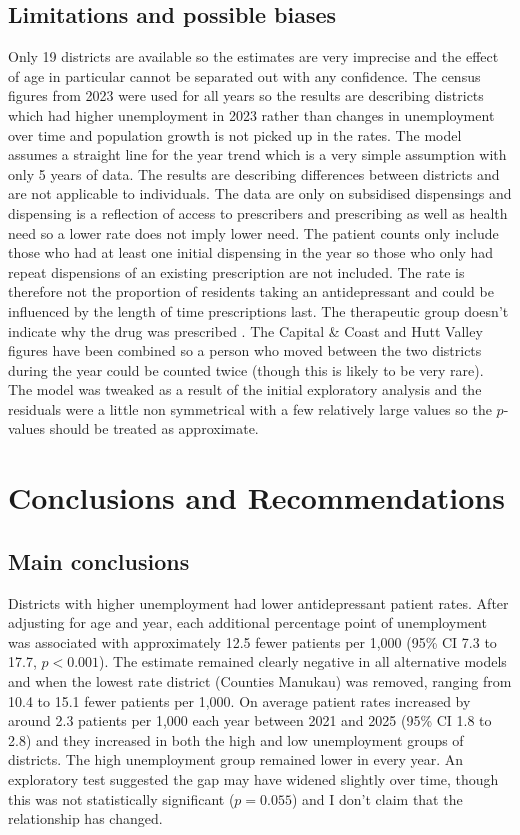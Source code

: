\documentclass[11pt,a4paper]{article}
\begin{document}
\subsection{Limitations and possible biases}
Only 19 districts are available so the estimates are very imprecise and the effect of age in particular cannot be separated out with any confidence. The census figures from 2023 were used for all years so the results are describing districts which had higher unemployment in 2023 rather than changes in unemployment over time and population growth is not picked up in the rates. The model assumes a straight line for the year trend which is a very simple assumption with only 5 years of data. The results are describing differences between districts and are not applicable to individuals. The data are only on subsidised dispensings and dispensing is a reflection of access to prescribers and prescribing as well as health need so a lower rate does not imply lower need. The patient counts only include those who had at least one initial dispensing in the year so those who only had repeat dispensions of an existing prescription are not included. The rate is therefore not the proportion of residents taking an antidepressant and could be influenced by the length of time prescriptions last. The therapeutic group doesn't indicate why the drug was prescribed \cite{hnz}. The Capital \& Coast and Hutt Valley figures have been combined so a person who moved between the two districts during the year could be counted twice (though this is likely to be very rare). The model was tweaked as a result of the initial exploratory analysis and the residuals were a little non symmetrical with a few relatively large values so the $p$-values should be treated as approximate.

\section{Conclusions and Recommendations}

\subsection{Main conclusions}
Districts with higher unemployment had lower antidepressant patient rates. After adjusting for age  and year, each additional percentage point of unemployment was associated with approximately 12.5 fewer patients per 1,000 (95\% CI 7.3 to 17.7, $p<0.001$). The estimate remained clearly negative in all alternative models and when the lowest rate district (Counties Manukau) was removed, ranging from 10.4 to 15.1 fewer patients per 1,000. On average patient rates increased by around 2.3 patients per 1,000 each year between 2021 and 2025 (95\% CI 1.8 to 2.8) and they increased in both the high and low unemployment groups of districts. The high unemployment group remained lower in every year. An exploratory test suggested the gap may have widened slightly over time, though this was not statistically significant ($p=0.055$) and I don't claim that the relationship has changed.
\end{document}
